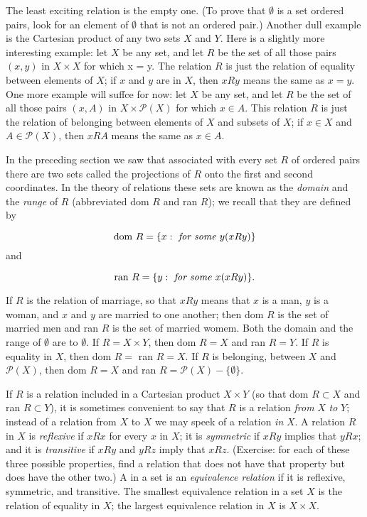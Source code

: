 The least exciting relation is the empty one. (To prove that $ \emptyset $ is a set ordered pairs, look for an element of $ \emptyset $ that is not an ordered pair.) Another dull example is the Cartesian product of any two sets $X$ and $Y$. Here is a slightly more interesting example: let $X$ be any set, and let $R $ be the set of all those pairs $(x, y)$ in $X \times X$ for which x = y. The relation $R $ is just the relation of equality between elements of $X$; if $x$ and $y$ are in $X$, then $x R y$ means the same as $x = y$. One more example will suffce for now: let $X$ be any set, and let $R $ be the set of all those pairs $(x, A)$ in $X \times \mathcal{P} (X)$ for which $x \in A$. This relation $R $ is just the relation of belonging between elements of $X$ and subsets of $X$; if $x \in X$ and $A \in \mathcal{P}(X)$, then $x R A$ means the same as $x \in A$. 

In the preceding section we saw that associated with every set $R$ of ordered pairs there are two sets called the projections of $R$ onto the first and second coordinates. In the theory of relations these sets are known as the \textit{domain} and the \textit{range} of $R$  (abbreviated dom $R$ and ran $R$); we recall that they are defined by 

\begin{equation*}
\text{dom } R = \{ x: \text{ \textit{for some} } y (x R y) \}
\end{equation*}
and

\begin{equation*}
\text{ran } R = \{ y: \text{ \textit{for some} } x (x R y) \}.
\end{equation*}

If $R$ is the relation of marriage, so that $x R y$ means that $x$ is a man, $y$ is a woman, and $x$ and $y$ are married to one another; then dom $R$ is the set of married men and ran $R$ is the set of married womem. Both the domain and the range of $\emptyset$ are to $\emptyset$. If $R = X \times Y$, then dom $ R = X$ and ran $R = Y$. If $R$ is equality in $X$, then dom $R =$ ran $R = X$. If $R$ is belonging, between $X$ and $\mathcal{P}(X)$, then dom $R = X$ and ran $R = \mathcal{P}(X) - \{ \emptyset \}$. 

If $R$ is a relation included in a Cartesian product $X \times Y$ (so that dom $R \subset X$ and ran $R \subset Y$), it is sometimes convenient to say that $R$ is a relation \textit{from} $X$ \textit{to} $Y$; instead of a relation from $X$ to $X$ we may speek of a relation \textit{in} $X$. A relation $R$ in $X$ is \textit{reflexive} if $x R x$ for every $x$ in $X$; it is \textit{symmetric} if $ x R y$ implies that $y R x$; and it is \textit{transitive} if $x R y$ and $y R z$ imply that $x R z$. (Exercise: for each of these three possible properties, find a relation that does not have that property but does have the other two.) A in a set is an \textit{equivalence relation} if it is reflexive, symmetric, and transitive. The smallest equivalence relation in a set $X$ is the relation of equality in $X$; the largest equivalence relation in $X$ is $X \times X$. 

